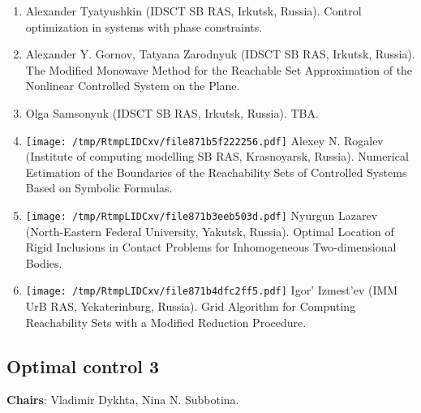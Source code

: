 \documentclass[
]{article}
\providecommand{\tightlist}{%
  \setlength{\itemsep}{0pt}\setlength{\parskip}{0pt}}
\begin{document}
\begin{enumerate}
\def\labelenumi{\arabic{enumi}.}
\tightlist
\item
  Alexander Tyatyushkin (IDSCT SB RAS, Irkutsk, Russia). Control
  optimization in systems with phase constraints.
\item
  Alexander Y. Gornov, Tatyana Zarodnyuk (IDSCT SB RAS, Irkutsk,
  Russia). The Modiﬁed Monowave Method for the Reachable Set
  Approximation of the Nonlinear Controlled System on the Plane.
\item
  Olga Samsonyuk (IDSCT SB RAS, Irkutsk, Russia). TBA.
\item
  \protect\texttt{[image: /tmp/RtmpLIDCxv/file871b5f222256.pdf]}
  Alexey N. Rogalev (Institute of computing modelling SB RAS,
  Krasnoyarsk, Russia). Numerical Estimation of the Boundaries of the
  Reachability Sets of Controlled Systems Based on Symbolic Formulas.
\item
  \protect\texttt{[image: /tmp/RtmpLIDCxv/file871b3eeb503d.pdf]}
  Nyurgun Lazarev (North-Eastern Federal University, Yakutsk, Russia).
  Optimal Location of Rigid Inclusions in Contact Problems for
  Inhomogeneous Two-dimensional Bodies.
\item
  \protect\texttt{[image: /tmp/RtmpLIDCxv/file871b4dfc2ff5.pdf]}
  Igor' Izmest'ev (IMM UrB RAS, Yekaterinburg, Russia). Grid Algorithm
  for Computing Reachability Sets with a Modified Reduction Procedure.
\end{enumerate}

\hypertarget{oc3}{%
\subsection{Optimal control 3}\label{oc3}}

\textbf{Chairs}: Vladimir Dykhta, Nina N. Subbotina.
\end{document}
